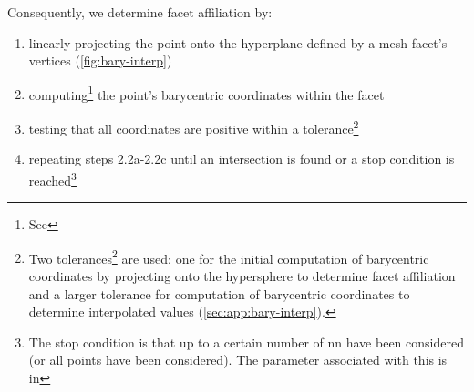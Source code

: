 \documentclass[final,12pt]{elsarticle}
\begin{document}
Consequently, we determine facet affiliation by:
\begin{enumerate}%
	\item[2.2a] linearly projecting the \outpt{} point onto the hyperplane defined by a mesh facet's vertices (\cref{fig:bary-interp})
	\item[2.2b] computing\footnote{See } the point's barycentric coordinates within the facet \cite{anatoliyCheckIfRay2015,skalaRobustBarycentricCoordinates2013}
	\item[2.2c] testing that all coordinates are positive \cite{langerSphericalBarycentricCoordinates2006} within a tolerance\footnote{Two tolerances\footnote{We typically use  in  and  in , respectively. } are used: one for the initial computation of barycentric coordinates by projecting onto the hypersphere to determine facet affiliation and a larger tolerance for computation of barycentric coordinates to determine interpolated values (\cref{sec:app:bary-interp}). }
	\item[2.2d] repeating steps 2.2a-2.2c until an intersection is found or a stop condition is reached\footnote{The stop condition is that up to a certain number of \gls{nn} have been considered (or all points have been considered). The parameter associated with this is  in  }
\end{enumerate}
\end{document}
